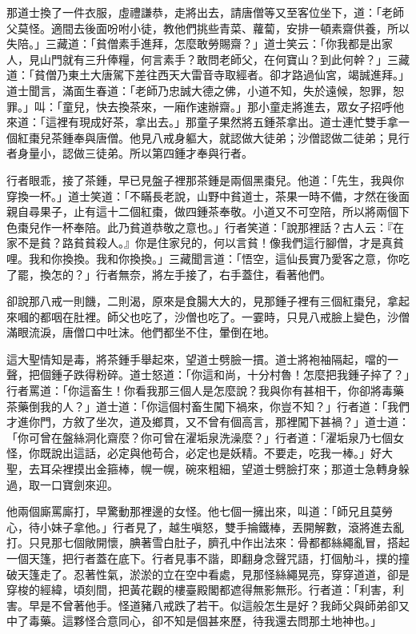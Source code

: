 那道士換了一件衣服，虛禮謙恭，走將出去，請唐僧等又至客位坐下，道：「老師父莫怪。適間去後面吩咐小徒，教他們挑些青菜、蘿蔔，安排一頓素齋供養，所以失陪。」三藏道：「貧僧素手進拜，怎麼敢勞賜齋？」道士笑云：「你我都是出家人，見山門就有三升俸糧，何言素手？敢問老師父，在何寶山？到此何幹？」三藏道：「貧僧乃東土大唐駕下差往西天大雷音寺取經者。卻才路過仙宮，竭誠進拜。」道士聞言，滿面生春道：「老師乃忠誠大德之佛，小道不知，失於遠候，恕罪，恕罪。」叫：「童兒，快去換茶來，一廂作速辦齋。」那小童走將進去，眾女子招呼他來道：「這裡有現成好茶，拿出去。」那童子果然將五鍾茶拿出。道士連忙雙手拿一個紅棗兒茶鍾奉與唐僧。他見八戒身軀大，就認做大徒弟；沙僧認做二徒弟；見行者身量小，認做三徒弟。所以第四鍾才奉與行者。

行者眼乖，接了茶鍾，早已見盤子裡那茶鍾是兩個黑棗兒。他道：「先生，我與你穿換一杯。」道士笑道：「不瞞長老說，山野中貧道士，茶果一時不備，才然在後面親自尋果子，止有這十二個紅棗，做四鍾茶奉敬。小道又不可空陪，所以將兩個下色棗兒作一杯奉陪。此乃貧道恭敬之意也。」行者笑道：「說那裡話？古人云：『在家不是貧？路貧貧殺人。』你是住家兒的，何以言貧！像我們這行腳僧，才是真貧哩。我和你換換。我和你換換。」三藏聞言道：「悟空，這仙長實乃愛客之意，你吃了罷，換怎的？」行者無奈，將左手接了，右手蓋住，看著他們。

卻說那八戒一則饑，二則渴，原來是食腸大大的，見那鍾子裡有三個紅棗兒，拿起來嘓的都咽在肚裡。師父也吃了，沙僧也吃了。一霎時，只見八戒臉上變色，沙僧滿眼流淚，唐僧口中吐沫。他們都坐不住，暈倒在地。

這大聖情知是毒，將茶鍾手舉起來，望道士劈臉一摜。道士將袍袖隔起，噹的一聲，把個鍾子跌得粉碎。道士怒道：「你這和尚，十分村魯！怎麼把我鍾子捽了？」行者罵道：「你這畜生！你看我那三個人是怎麼說？我與你有甚相干，你卻將毒藥茶藥倒我的人？」道士道：「你這個村畜生闖下禍來，你豈不知？」行者道：「我們才進你門，方敘了坐次，道及鄉貫，又不曾有個高言，那裡闖下甚禍？」道士道：「你可曾在盤絲洞化齋麼？你可曾在濯垢泉洗澡麼？」行者道：「濯垢泉乃七個女怪，你既說出這話，必定與他苟合，必定也是妖精。不要走，吃我一棒。」好大聖，去耳朵裡摸出金箍棒，幌一幌，碗來粗細，望道士劈臉打來；那道士急轉身躲過，取一口寶劍來迎。

他兩個廝罵廝打，早驚動那裡邊的女怪。他七個一擁出來，叫道：「師兄且莫勞心，待小妹子拿他。」行者見了，越生嗔怒，雙手掄鐵棒，丟開解數，滾將進去亂打。只見那七個敞開懷，腆著雪白肚子，臍孔中作出法來：骨都都絲繩亂冒，搭起一個天篷，把行者蓋在底下。行者見事不諧，即翻身念聲咒語，打個觔斗，撲的撞破天篷走了。忍著性氣，淤淤的立在空中看處，見那怪絲繩晃亮，穿穿道道，卻是穿梭的經緯，頃刻間，把黃花觀的樓臺殿閣都遮得無影無形。行者道：「利害，利害。早是不曾著他手。怪道豬八戒跌了若干。似這般怎生是好？我師父與師弟卻又中了毒藥。這夥怪合意同心，卻不知是個甚來歷，待我還去問那土地神也。」

